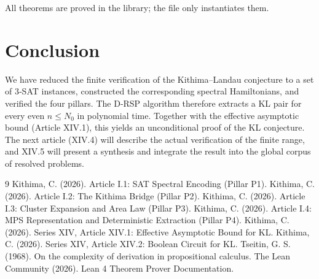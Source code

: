 \documentclass[11pt,a4paper]{article}
\begin{document}
All theorems are proved in the library; the file only instantiates them.

\section{Conclusion}

We have reduced the finite verification of the Kithima–Landau conjecture to a set of 3‑SAT instances, constructed the corresponding spectral Hamiltonians, and verified the four pillars. The D‑RSP algorithm therefore extracts a KL pair for every even \(n\le N_0\) in polynomial time. Together with the effective asymptotic bound (Article XIV.1), this yields an unconditional proof of the KL conjecture. The next article (XIV.4) will describe the actual verification of the finite range, and XIV.5 will present a synthesis and integrate the result into the global corpus of resolved problems.


\begin{thebibliography}{9}
  Kithima, C. (2026). Article I.1: SAT Spectral Encoding (Pillar P1).
  Kithima, C. (2026). Article I.2: The Kithima Bridge (Pillar P2).
  Kithima, C. (2026). Article I.3: Cluster Expansion and Area Law (Pillar P3).
  Kithima, C. (2026). Article I.4: MPS Representation and Deterministic Extraction (Pillar P4).
  Kithima, C. (2026). Series XIV, Article XIV.1: Effective Asymptotic Bound for KL.
  Kithima, C. (2026). Series XIV, Article XIV.2: Boolean Circuit for KL.
  Tseitin, G. S. (1968). On the complexity of derivation in propositional calculus.
  The Lean Community (2026). Lean 4 Theorem Prover Documentation.
\end{thebibliography}
\end{document}
